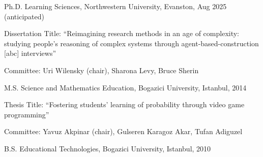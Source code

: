 \documentclass[11pt,letterpaper]{report} %
\begin{document}
    \begin{tablist}

        \item[Ph.D.] \tab{}Learning Sciences, Northwestern University, Evanston, Aug 2025 (anticipated) \\

        \vspace{4pt}

        \footnotesize Dissertation Title: \enquote{Reimagining research methods in an age of complexity: studying people’s reasoning of complex systems through agent-based-construction [abc] interviews} \normalsize \\

        \vspace{4pt}

        \footnotesize Committee: Uri Wilensky (chair), Sharona Levy, Bruce Sherin \normalsize \\

        \vspace{8pt}

        \item[M.S.]  \tab{}Science and Mathematics Education, Bogazici University, Istanbul, 2014 \\

        \vspace{4pt}

        \footnotesize Thesis Title: \enquote{Fostering students' learning of probability through video game programming} \normalsize \\

        \vspace{4pt}

        \footnotesize Committee: Yavuz Akpinar (chair), Gulseren Karagoz Akar, Tufan Adiguzel\normalsize

        \vspace{8pt}

        \item[B.S.]  \tab{}Educational Technologies, Bogazici University, Istanbul, 2010

    \end{tablist}
\end{document}
